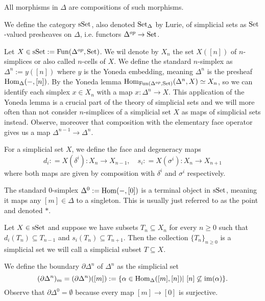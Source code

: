\documentclass[../../thesis.tex]{subfiles}
\begin{document}
\begin{remark}
    All morphisms in $\Delta$ are compositions of such morphisms.
\end{remark}
\begin{definition}
    We define the category $\mathrm{sSet}$, also denoted $\mathrm{Set}_{\Delta}$ by Lurie, of simplicial sets as $\mathrm{Set}$-valued presheaves on $\Delta$, i.e. functors $\Delta^{op}\to\mathrm{Set}$.
\end{definition}
Let $X \in \mathrm{sSet} : = \mathrm{Fun}(\Delta^{op}, \mathrm{Set})$. We wil denote by $X_n$ the set $X([n])$ of $n$-simplices or also called $n$-cells of $X$.
We define the standard $n$-simplex as $\Delta^n:=y([n])$ where $y$ is the Yoneda embedding, meaning $\Delta^n$ is the presheaf $\mathrm{Hom}_{\Delta}({-},[n])$.
By the Yoneda lemma $\mathrm{Hom}_{\mathrm{Fun}(\Delta^{op}, \mathrm{Set})}(\Delta^n, X) \simeq X_n$, so we can identify each simplex $x\in X_n$ with a map $x:\Delta^n\to X$.
This application of the Yoneda lemma is a crucial part of the theory of simplicial sets and we will more often than not consider $n$-simplices of a simplicial set $X$ as maps of simplicial sets instead.
Observe, moreover that composition with the elementary face operator gives us a map $\Delta^{n-1}\to\Delta^n$.
\begin{definition}
    For a simplicial set $X$, we define the face and degeneracy maps
    \[
        d_i: = X(\delta^i): X_{n} \to X_{n-1}, \quad s_i: = X(\sigma^i): X_{n} \to X_{n+1}
    \]
    where both maps are given by composition with $\delta^i$ and $\sigma^i$ respectively.
\end{definition}
\begin{example}
    The standard $0$-simplex $\Delta^0:=\mathrm{Hom}({-}, [0])$ is a terminal object in $\mathrm{sSet}$, meaning it maps any $[m]\in \Delta$ to a singleton.
    This is usually just referred to as the point and denoted $*$.
\end{example}
\begin{example}
    Let $X \in \mathrm{sSet}$ and suppose we have subsets $T_n\subseteq X_n$ for every $n\geq 0$ such that $d_i(T_n)\subseteq T_{n-1}$ and $s_i(T_n) \subseteq T_{n+1}$.
    Then the collection $\{T_n\}_{n\geq 0}$ is a simplicial set we will call a simplicial subset $T\subseteq X$.
\end{example}
\begin{definition}
    We define the boundary $\partial\Delta^n$ of $\Delta^n$ as the simplicial set
    \[
        (\partial\Delta^n)_m = (\partial\Delta^n)([m]) :=\{\alpha \in \Hom_{\Delta}([m], [n]) | [n] \not\subseteq \mathrm{im}(\alpha)\}.
    \]
    Observe that $\partial\Delta^0=\emptyset$ because every map $[m] \to [0]$ is surjective.
\end{definition}
\end{document}
